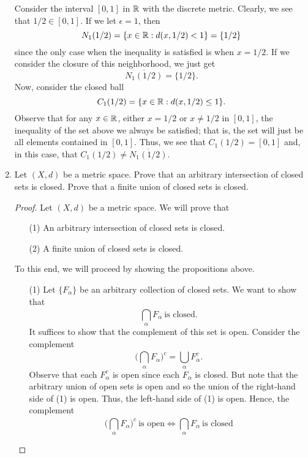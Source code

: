 \documentclass[a4paper]{article}
\begin{document}
\begin{enumerate}
\begin{solution}
            Consider the interval \( [0,1] \) in \( \mathbb{R}  \) with the discrete metric. Clearly, we see that \( 1/2 \in [0,1] \). If we let \( \epsilon = 1   \), then 
            \[  {N}_{1}(1/2) = \{ x \in \mathbb{R} : d(x,1/2) < 1 \} = \{ 1/2 \}  \]
            since the only case when the inequality is satisfied is when \( x =  1/2  \). If we consider the closure of this neighborhood, we just get 
            \[  \overline{{N}_{1}(1/2)} = \{ 1/2 \}. \]
            Now, consider the closed ball 
            \[  {C}_{1}(1/2) = \{ x \in \mathbb{R} : d(x,1/2) \leq 1  \}. \]
            Observe that for any \( x \in \mathbb{R}  \), either \( x = 1/2 \) or \( x \neq 1/2 \) in \( [0,1] \), the inequality of the set above we always be satisfied; that is, the set will just be all elements contained in \( [0,1]  \). Thus, we see that \( {C}_{1}(1/2) = [0,1] \) and, in this case, that \( {C}_{1}(1/2) \neq \overline{{N}_{1}(1/2)} \).  
        \end{solution}
    \item Let \( (X,d) \) be a metric space. Prove that an arbitrary intersection of closed sets is closed. Prove that a finite union of closed sets is closed. 
        \begin{proof}
        Let \( (X,d) \) be a metric space. We will prove that
        \begin{enumerate}
            \item[(1)] An arbitrary intersection of closed sets is closed.
            \item[(2)] A finite union of closed sets is closed.
        \end{enumerate}
        To this end, we will proceed by showing the propositions above. 
        \begin{enumerate}
            \item[(1)] Let \( \{ {F}_{\alpha} \}  \) be an arbitrary collection of closed sets. We want to show that 
                \[  \bigcap_{ \alpha }^{  }  {F}_{\alpha} \ \text{is closed.} \]
               It suffices to show that the complement of this set is open. Consider the complement
               \[  \Big(  \bigcap_{ \alpha }^{  }  {F}_{\alpha} \Big)^{c} = \bigcup_{ \alpha }^{  } {F}_{\alpha}^{c}. \tag{1} \]
               Observe that each \( {F}_{\alpha}^{c} \) is open since each \( {F}_{\alpha} \) is closed. But note that the arbitrary union of open sets is open and so the union of the right-hand side of (1) is open. Thus, the left-hand side of (1) is open. Hence, the complement  
               \[  \Big(  \bigcap_{ \alpha }^{  } {F}_{\alpha} \Big)^{c} \ \text{is open} \Longleftrightarrow \bigcap_{ \alpha }^{  }  {F}_{\alpha} \ \text{is closed}  \]

\end{enumerate}
\end{proof}
\end{enumerate}
\end{document}
